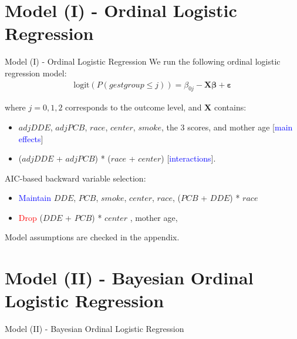 \documentclass{beamer}\usepackage[]{graphicx}\usepackage[]{color}
\begin{document}
\section{Model (I) - Ordinal Logistic Regression}
\begin{frame}{Model (I) - Ordinal Logistic Regression}
We run the following ordinal logistic regression model:
\begin{align*}
	\textrm{logit}(P(gestgroup \leq j)) = \beta_{0j} - \mathbf{X} \boldsymbol{\beta} + \boldsymbol{\varepsilon}
\end{align*}

where $j = 0,1,2$ corresponds to the outcome level, and \textbf{X} contains:
\begin{itemize}
	\item $adjDDE$, $adjPCB$, $race$, $center$, $smoke$, the 3 scores, and mother age [\textcolor{blue}{main effects}]
	\item ($adjDDE$ + $adjPCB$) * ($race$ + $center$) [\textcolor{blue}{interactions}].
\end{itemize}
\medskip
AIC-based backward variable selection:
\begin{itemize}
	\item \textcolor{blue}{Maintain} $DDE$, $PCB$, $smoke$, $center$, $race$, ($PCB$ + $DDE$) * $race$
	\item \textcolor{red}{Drop} ($DDE$ + $PCB$) * $center$ , mother age, 
\end{itemize}

Model assumptions are checked in the appendix.
\end{frame}


\section{Model (II) - Bayesian Ordinal Logistic Regression}
\begin{frame}{Model (II) - Bayesian Ordinal Logistic Regression}

\end{frame}

\end{document}
